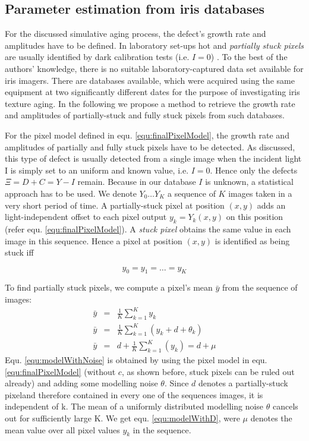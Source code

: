 \documentclass[10pt,twocolumn,letterpaper]{article}
\begin{document}
 
 
 
 \subsection{Parameter estimation from iris databases}
 \label{hotPixelRate}
 For the discussed simulative aging process, the defect's growth rate and amplitudes have to be defined. In laboratory set-ups hot and \emph{partially stuck pixels} are usually identified by dark calibration tests (i.e. $I=0$) \cite{defectIdentification}. To the best of the authors' knowledge, there is no suitable laboratory-captured data set available for iris imagers. There are databases \cite{czajkaTemplateAging} available, which were acquired using the same equipment at two significantly different dates for the purpose of investigating iris texture aging. In the following we propose a method to retrieve the growth rate and amplitudes of partially-stuck and fully stuck pixels from such databases.

For the pixel model defined in equ. \ref{equ:finalPixelModel}, the growth rate and amplitudes of partially and fully stuck pixels have to be detected. As discussed, this type of defect is usually detected from a single image when the incident light I is simply set to an uniform and known value, i.e. $I=0$. Hence only the defects $\Xi = D+C = Y-I$ remain. Because in our database $I$ is unknown, a statistical approach has to be used.
We denote $Y_0 \dots Y_K$ a sequence of $K$ images taken in a very short period of time. A partially-stuck pixel at position $(x,y)$ adds an light-independent offset to each pixel output $y_k = Y_k({x,y})$ on this position (refer equ. \ref{equ:finalPixelModel}). A \emph{stuck pixel} obtains the same value in each image in this sequence. Hence a pixel at position $(x,y)$ is identified as being stuck iff

\begin{equation}
y_{0} = y_{1} = \dots = y_{K} \label{equ:conditionStuck}
\end{equation}

To find partially stuck pixels, we compute a pixel's mean $\bar{y}$ from the sequence of images:
\begin{eqnarray}
\bar{y} & = & \frac{1}{K}\sum\limits_{k=1}^{K}y_k \\
\bar{y} & = & \frac{1}{K}\sum\limits_{k=1}^{K}(y_k+d+\theta_k) \label{equ:modelWithNoise} \\
\bar{y} & = & d+\frac{1}{K}\sum\limits_{k=1}^{K}(y_k) = d + \mu \label{equ:modelWithD}
\end{eqnarray}
Equ. \ref{equ:modelWithNoise} is obtained by using the pixel model in equ. \ref{equ:finalPixelModel} (without $c$, as shown before, stuck pixels can be ruled out already) and adding some modelling noise $\theta$. Since $d$ denotes a partially-stuck pixeland therefore contained in every one of the sequences images, it is independent of k. The mean of a uniformly distributed modelling noise $\theta$ cancels out for sufficiently large K. We get equ. \ref{equ:modelWithD}, were $\mu$ denotes the mean value over all pixel values $y_k$ in the sequence.
\end{document}
